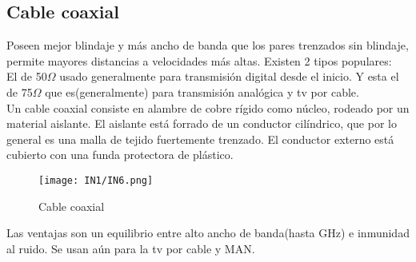 \documentclass[
	11pt, %
	fleqn, %
	a4paper, %
]{LegrandOrangeBook}
\begin{document}
\subsection{Cable coaxial}
Poseen mejor blindaje y más ancho de banda que los pares trenzados sin blindaje, permite mayores distancias a velocidades más altas. Existen 2 tipos populares:\\
El de 50$\Omega$ usado generalmente para transmisión digital desde el inicio. Y esta el de 75$\Omega$ que es(generalmente) para transmisión analógica y tv por cable.\\
Un cable coaxial consiste en alambre de cobre rígido como núcleo, rodeado por un material aislante. El aislante está forrado de un conductor cilíndrico, que por lo general es una malla de tejido fuertemente trenzado. El conductor externo está cubierto con una funda protectora de plástico.
\begin{figure}[H]
\centering
\texttt{[image: IN1/IN6.png]}
\caption{Cable coaxial}
\label{fig:utp cat 5}
\end{figure}
Las ventajas son un equilibrio entre alto ancho de banda(hasta GHz) e inmunidad al ruido. Se usan aún para la tv por cable y MAN.
\newpage
\end{document}
